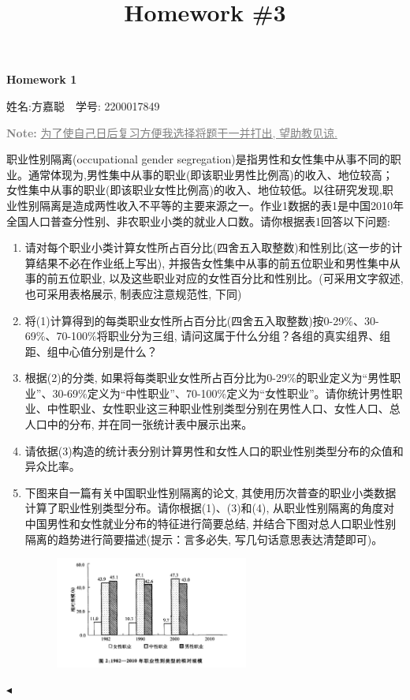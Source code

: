 \documentclass[11pt]{article}
\title{Homework \#3}
\newenvironment{problem}[2][Problem]{\begin{trivlist}
\item[\hskip \labelsep {\bfseries #1}\hskip \labelsep {\bfseries #2.}]\songti}{\hfill$\blacktriangleleft$\end{trivlist}}
\newcommand\1{\mathds{1}}
\begin{document}
\kaishu

\pagestyle{fancy}
\chead{}
\fancyfoot[C]{\thepage\ /\ \pageref{LastPage} \\ \textcolor{lightgray}{最后编译时间: \today}}



\begin{center}
    {\LARGE \bf Homework 1}

    {姓名:方嘉聪\ \  学号: 2200017849}            %
\end{center}
\textcolor{gray}{\textbf{Note: }\underline{为了使自己日后复习方便我选择将题干一并打出, 望助教见谅.}}
\begin{problem}{1}
    职业性别隔离(occupational gender segregation)是指男性和女性集中从事不同的职业。通常体现为,男性集中从事的职业(即该职业男性比例高)的收入、地位较高；女性集中从事的职业(即该职业女性比例高)的收入、地位较低。以往研究发现,职业性别隔离是造成两性收入不平等的主要来源之一。作业1数据的表1是中国2010年全国人口普查分性别、非农职业小类的就业人口数。请你根据表1回答以下问题:
    \begin{enumerate}[label=(\arabic*)]
        \item 请对每个职业小类计算女性所占百分比(四舍五入取整数)和性别比{\kaishu(这一步的计算结果不必在作业纸上写出)}, 并报告女性集中从事的前五位职业和男性集中从事的前五位职业, 以及这些职业对应的女性百分比和性别比。{\kaishu(可采用文字叙述, 也可采用表格展示, 制表应注意规范性, 下同)}
        \item 将(1)计算得到的每类职业女性所占百分比(四舍五入取整数)按0-29\%、30-69\%、70-100\%将职业分为三组, 请问这属于什么分组？各组的真实组界、组距、组中心值分别是什么？ 
        \item 根据(2)的分类, 如果将每类职业女性所占百分比为0-29\%的职业定义为“男性职业”、30-69\%定义为“中性职业”、70-100\%定义为“女性职业”。请你统计男性职业、中性职业、女性职业这三种职业性别类型分别在男性人口、女性人口、总人口中的分布, 并在同一张统计表中展示出来。
        \item 请依据(3)构造的统计表分别计算男性和女性人口的职业性别类型分布的众值和异众比率。
        \item 下图来自一篇有关中国职业性别隔离的论文, 其使用历次普查的职业小类数据计算了职业性别类型分布。请你根据(1)、(3)和(4), 从职业性别隔离的角度对中国男性和女性就业分布的特征进行简要总结, 并结合下图对总人口职业性别隔离的趋势进行简要描述{\kaishu(提示：言多必失, 写几句话意思表达清楚即可)}。
        \begin{figure}[H]
            \centering
            \includegraphics[width=0.6\textwidth]{./images/1.jpg}
        \end{figure}
    \end{enumerate}
\end{problem}
\end{document}
